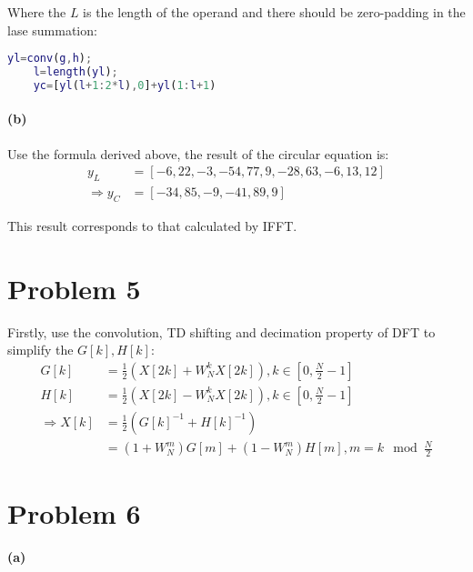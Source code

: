 \documentclass{article}
\begin{document}
Where the \( L \) is the length of the operand and there should be zero-padding in the lase summation:
\begin{lstlisting}[language=matlab,style=matlab]
    yl=conv(g,h);
    l=length(yl);
    yc=[yl(l+1:2*l),0]+yl(1:l+1)
\end{lstlisting}

\paragraph{(b)}

Use the formula derived above, the result of the circular equation is:
\begin{equation}
	\begin{aligned}
		y_{L}             & =[-6,22,-3,-54,77,9,-28,63,-6,13,12] \\
		\Rightarrow y_{C} & =[-34,85,-9,-41,89,9]
	\end{aligned}
\end{equation}

This result corresponds to that calculated by IFFT.

\section{Problem 5}

Firstly, use the convolution, TD shifting and decimation property of DFT to simplify the \( G[k],H[k] \):
\begin{equation}
	\begin{aligned}
		G[k]             & =\frac{1}{2}\left( X[2k]+W_{N}^{k}X[2k] \right),k\in[0,\frac{N}{2}-1] \\
		H[k]             & =\frac{1}{2}\left( X[2k]-W_{N}^{k}X[2k] \right),k\in[0,\frac{N}{2}-1] \\
		\Rightarrow X[k] & =\frac{1}{2}(G[k]^{-1}+H[k]^{-1})                                     \\
		                 & =(1+W_{N}^{m})G[m]+(1-W_{N}^{m})H[m],m=k \mod \frac{N}{2}
	\end{aligned}
\end{equation}

\section{Problem 6}
\paragraph{(a)}
\end{document}
